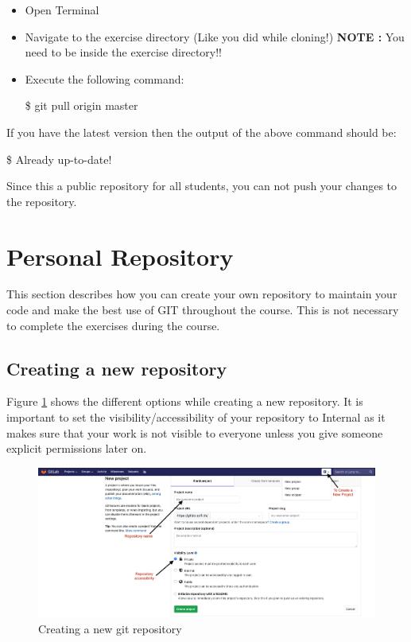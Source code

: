 \documentclass{cmc}
\begin{document}
\begin{itemize}
\item Open Terminal
\item Navigate to the exercise directory (Like you did while cloning!)
  \textbf{NOTE : } You need to be inside the exercise directory!!
\item Execute the following command:
  \begin{center}
    \$ git pull origin master
  \end{center}
\end{itemize}

If you have the latest version then the output of the above command
should be:

\begin{center}
  \$ Already up-to-date!
\end{center}

Since this a public repository for all students, you can not push your
changes to the repository.

\newpage
\section{Personal Repository}
\label{sec:creat-new-repos}

This section describes how you can create your own repository to
maintain your code and make the best use of GIT throughout the
course. This is not necessary to complete the exercises during the
course.

\subsection{Creating a new repository}
\label{sec:creat-new-repos-1}

Figure \ref{fig:git-create-repo} shows the different options while
creating a new repository.  It is important to set the
visibility/accessibility of your repository to Internal as it makes
sure that your work is not visible to everyone unless you give someone
explicit permissions later on.

\begin{figure}[H]
  \centering
  \includegraphics[width=\textwidth]{figures/GIT-RepositoryCreation}
  \caption{Creating a new git repository}
  \label{fig:git-create-repo}
\end{figure}
\end{document}
